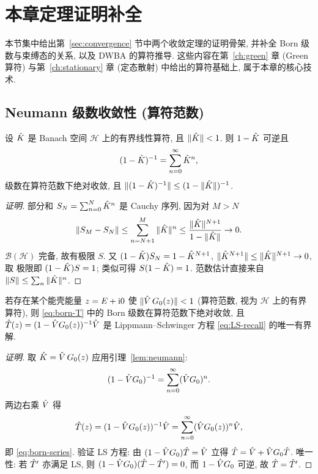\section{本章定理证明补全}\label{sec:born-proofs}

本节集中给出第~\ref{sec:convergence} 节中两个收敛定理的证明骨架, 并补全
Born 级数与束缚态的关系, 以及 DWBA 的算符推导. 这些内容在第~\ref{ch:green}
章 (Green 算符) 与第~\ref{ch:stationary} 章 (定态散射) 中给出的算符基础上,
属于本章的核心技术.

\subsection{Neumann 级数收敛性 (算符范数)}

\begin{lemma}[几何级数引理]\label{lem:neumann}
设 $\hat{K}$ 是 Banach 空间 $\mathcal H$ 上的有界线性算符, 且
$\|\hat{K}\|<1$. 则 $1-\hat{K}$ 可逆且
\begin{equation}
(1-\hat{K})^{-1}=\sum_{n=0}^{\infty}\hat{K}^{n},
\label{eq:born-neumann}
\end{equation}
级数在算符范数下绝对收敛, 且 $\|(1-\hat{K})^{-1}\|\le (1-\|\hat{K}\|)^{-1}$.
\end{lemma}

\begin{proof}[证明]
部分和 $S_{N}=\sum_{n=0}^{N}\hat{K}^{n}$ 是 Cauchy 序列, 因为对 $M>N$
\begin{equation}
\|S_{M}-S_{N}\|\le\sum_{n=N+1}^{M}\|\hat{K}\|^{n}\le\frac{\|\hat{K}\|^{N+1}}{1-\|\hat{K}\|}\to 0.
\label{eq:born-neumann-cauchy}
\end{equation}
$\mathcal B(\mathcal H)$ 完备, 故有极限 $S$. 又
$(1-\hat{K})S_{N}=1-\hat{K}^{N+1}$, $\|\hat{K}^{N+1}\|\le\|\hat{K}\|^{N+1}\to 0$, 取
极限即 $(1-\hat{K})S=1$; 类似可得 $S(1-\hat{K})=1$. 范数估计直接来自
$\|S\|\le\sum_n\|\hat{K}\|^n$.
\end{proof}

\begin{theorem}\label{thm:born-conv}
若存在某个能壳能量 $z=E+\mathrm{i} 0$ 使 $\|\hat{V}\,G_{0}(z)\|<1$
(算符范数, 视为 $\mathcal H$ 上的有界算符), 则 \eqref{eq:born-T} 中的 Born
级数在算符范数下绝对收敛, 且 $\hat{T}(z)=(1-\hat{V} G_{0}(z))^{-1}\hat{V}$ 是
Lippmann--Schwinger 方程 \eqref{eq:LS-recall} 的唯一有界解.
\end{theorem}

\begin{proof}[证明]
取 $\hat{K}=\hat{V}\,G_{0}(z)$ 应用引理~\ref{lem:neumann}:
\begin{equation}
(1-\hat{V} G_{0})^{-1}=\sum_{n=0}^{\infty}(\hat{V} G_{0})^{n}.
\label{eq:born-conv-1}
\end{equation}
两边右乘 $\hat{V}$ 得
\begin{equation}
\hat{T}(z)=(1-\hat{V} G_{0}(z))^{-1}\hat{V}=\sum_{n=0}^{\infty}(\hat{V} G_{0}(z))^{n}\hat{V},
\label{eq:born-conv-2}
\end{equation}
即 \eqref{eq:born-series}. 验证 LS 方程: 由
$(1-\hat{V} G_{0})\hat{T}=\hat{V}$ 立得 $\hat{T}=\hat{V}+\hat{V} G_{0}\hat{T}$.
唯一性: 若 $\hat{T}'$ 亦满足 LS, 则 $(1-\hat{V} G_{0})(\hat{T}-\hat{T}')=0$, 而
$1-\hat{V} G_{0}$ 可逆, 故 $\hat{T}=\hat{T}'$.
\end{proof}

